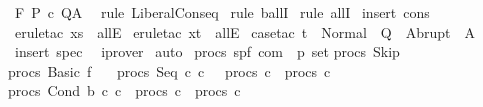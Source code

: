 \begin{isabellebody}
\ {\isachardoublequoteopen}{\isasymGamma}{\isacharcomma}{\isasymTheta}{\isasymturnstile}\isactrlbsub {\isacharslash}F\isactrlesub \ P\ c\ Q{\isacharcomma}A\ {\isachardoublequoteclose}\isanewline
%
\isadelimproof
%
\endisadelimproof
%
\isatagproof
{}\isamarkupfalse%
\ {\isacharparenleft}rule\ LiberalConseq{\isacharparenright}\isanewline
{}\isamarkupfalse%
\ {\isacharparenleft}rule\ ballI{\isacharparenright}\isanewline
{}\isamarkupfalse%
\ {\isacharparenleft}rule\ allI{\isacharparenright}\isanewline
{}\isamarkupfalse%
\ {\isacharparenleft}insert\ cons{\isacharparenright}\isanewline
{}\isamarkupfalse%
\ {\isacharparenleft}erule{\isacharunderscore}tac\ x{\isacharequal}s\ \ allE{\isacharparenright}\isanewline
{}\isamarkupfalse%
\ {\isacharparenleft}erule{\isacharunderscore}tac\ x{\isacharequal}t\ \ allE{\isacharparenright}\isanewline
{}\isamarkupfalse%
\ {\isacharparenleft}case{\isacharunderscore}tac\ {\isachardoublequoteopen}t\ {\isasymin}\ Normal\ {\isacharbackquote}\ Q\ {\isasymunion}\ Abrupt\ {\isacharbackquote}\ A{\isachardoublequoteclose}{\isacharparenright}\isanewline
{}\isamarkupfalse%
\ {\isacharparenleft}insert\ spec{\isacharparenright}\isanewline
{}\isamarkupfalse%
\ \ iprover\isanewline
{}\isamarkupfalse%
\ auto\isanewline
{}\isamarkupfalse%
%
\endisatagproof
{\isafoldproof}%
%
\isadelimproof
\isanewline
%
\endisadelimproof
\isanewline
{}\isamarkupfalse%
\ procs{\isacharcolon}{\isacharcolon}\ {\isachardoublequoteopen}{\isacharparenleft}{\isacharprime}s{\isacharcomma}{\isacharprime}p{\isacharcomma}{\isacharprime}f{\isacharparenright}\ com\ {\isasymRightarrow}\ {\isacharprime}p\ set{\isachardoublequoteclose}\isanewline
{}\isanewline
{\isachardoublequoteopen}procs\ Skip\ {\isacharequal}\ {\isacharbraceleft}{\isacharbraceright}{\isachardoublequoteclose}\ {\isacharbar}\isanewline
{\isachardoublequoteopen}procs\ {\isacharparenleft}Basic\ f{\isacharparenright}\ {\isacharequal}\ {\isacharbraceleft}{\isacharbraceright}{\isachardoublequoteclose}\ {\isacharbar}\isanewline
{\isachardoublequoteopen}procs\ {\isacharparenleft}Seq\ c\ c\ \ {\isacharequal}\ {\isacharparenleft}procs\ c\ {\isasymunion}\ procs\ c\ {\isacharbar}\isanewline
{\isachardoublequoteopen}procs\ {\isacharparenleft}Cond\ b\ c\ c\ {\isacharequal}\ {\isacharparenleft}procs\ c\ {\isasymunion}\ procs\ c\ {\isacharbar}\isanewline

\end{isabellebody}
